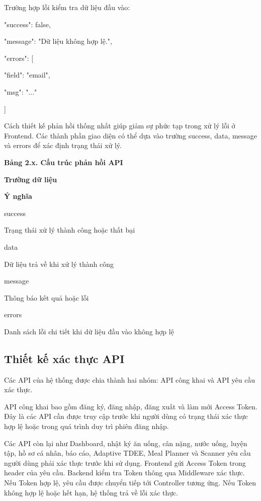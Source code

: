 \documentclass[12pt, a4paper]{report}
\begin{document}
Trường hợp lỗi kiểm tra dữ liệu đầu vào:

{

  "success": false,

  "message": "Dữ liệu không hợp lệ.",

  "errors": [

    {

      "field": "email",

      "msg": "..."

    }

  ]

}

Cách thiết kế phản hồi thống nhất giúp giảm sự phức tạp trong xử lý lỗi ở Frontend. Các thành phần giao diện có thể dựa vào trường success, data, message và errors để xác định trạng thái xử lý.

\textbf{Bảng 2.x. Cấu trúc phản hồi API}

\textbf{Trường dữ liệu}

\textbf{Ý nghĩa}

success

Trạng thái xử lý thành công hoặc thất bại

data

Dữ liệu trả về khi xử lý thành công

message

Thông báo kết quả hoặc lỗi

errors

Danh sách lỗi chi tiết khi dữ liệu đầu vào không hợp lệ

\subsection{Thiết kế xác thực API}Các API của hệ thống được chia thành hai nhóm: API công khai và API yêu cầu xác thực.

API công khai bao gồm đăng ký, đăng nhập, đăng xuất và làm mới Access Token. Đây là các API cần được truy cập trước khi người dùng có trạng thái xác thực hợp lệ hoặc trong quá trình duy trì phiên đăng nhập.

Các API còn lại như Dashboard, nhật ký ăn uống, cân nặng, nước uống, luyện tập, hồ sơ cá nhân, báo cáo, Adaptive TDEE, Meal Planner và Scanner yêu cầu người dùng phải xác thực trước khi sử dụng. Frontend gửi Access Token trong header của yêu cầu. Backend kiểm tra Token thông qua Middleware xác thực. Nếu Token hợp lệ, yêu cầu được chuyển tiếp tới Controller tương ứng. Nếu Token không hợp lệ hoặc hết hạn, hệ thống trả về lỗi xác thực.
\end{document}
